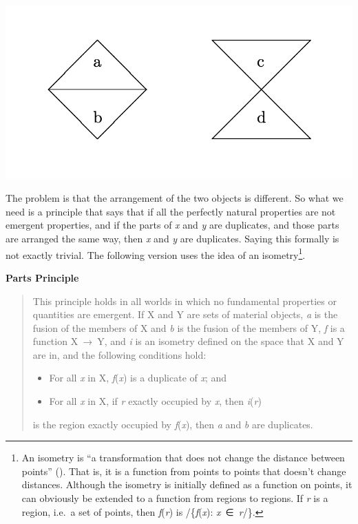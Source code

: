 \documentclass[
  10pt,
  letterpaper,
  DIV=11,
  numbers=noendperiod,
  twoside]{scrartcl}
\providecommand{\tightlist}{%
  \setlength{\itemsep}{0pt}\setlength{\parskip}{0pt}}\usepackage{longtable,booktabs,array}
\begin{document}
\includegraphics{images/amp_1.png}

The problem is that the arrangement of the two objects is different. So
what we need is a principle that says that if all the perfectly natural
properties are not emergent properties, and if the parts of \emph{x} and
\emph{y} are duplicates, and those parts are arranged the same way, then
\emph{x} and \emph{y} are duplicates. Saying this formally is not
exactly trivial. The following version uses the idea of an
isometry\footnote{An isometry is ``a transformation that does not change
  the distance between points'' (). That is, it is a function from points to points that doesn't
  change distances. Although the isometry is initially defined as a
  function on points, it can obviously be extended to a function from
  regions to regions. If \emph{r} is a region, i.e.~a set of points,
  then \emph{f}(\emph{r}) is /\{\emph{f}(\emph{x}):
  \emph{x}~∈~\emph{r}/\}.}.

\textbf{Parts Principle}

\begin{quote}
This principle holds in all worlds in which no fundamental properties or
quantities are emergent. If X and Y are sets of material objects,
\emph{a} is the fusion of the members of X and \emph{b} is the fusion of
the members of Y, \emph{f} is a function X~→~Y, and \emph{i} is an
isometry defined on the space that X and Y are in, and the following
conditions hold:

\begin{itemize}
\tightlist
\item
  For all \emph{x} in X, \emph{f}(\emph{x}) is a duplicate of \emph{x};
  and
\item
  For all \emph{x} in X, if \emph{r} exactly occupied by \emph{x}, then
  \emph{i}(\emph{r})
\end{itemize}

is the region exactly occupied by \emph{f}(\emph{x}), then \emph{a} and
\emph{b} are duplicates.
\end{quote}
\end{document}
